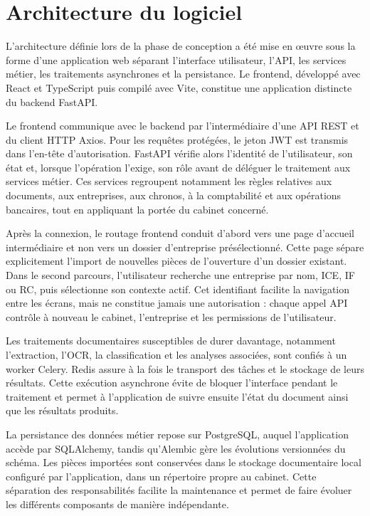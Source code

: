 \documentclass[12pt,a4paper,oneside]{report}
\begin{document}
\section{Architecture du logiciel}

L'architecture définie lors de la phase de conception a été mise en œuvre sous
la forme d'une application web séparant l'interface utilisateur, l'API, les
services métier, les traitements asynchrones et la persistance. Le frontend,
développé avec React et TypeScript puis compilé avec Vite, constitue une
application distincte du backend FastAPI.

Le frontend communique avec le backend par l'intermédiaire d'une API REST et
du client HTTP Axios. Pour les requêtes protégées, le jeton JWT est transmis
dans l'en-tête d'autorisation. FastAPI\cite{fastapi} vérifie alors l'identité de
l'utilisateur, son état et, lorsque l'opération l'exige, son rôle avant de
déléguer le traitement aux services métier. Ces services regroupent notamment
les règles relatives aux documents, aux entreprises, aux chronos, à la
comptabilité et aux opérations bancaires, tout en appliquant la portée du
cabinet concerné.

Après la connexion, le routage frontend conduit d'abord vers une page d'accueil
intermédiaire et non vers un dossier d'entreprise présélectionné. Cette page
sépare explicitement l'import de nouvelles pièces de l'ouverture d'un dossier
existant. Dans le second parcours, l'utilisateur recherche une entreprise par
nom, ICE, IF ou RC, puis sélectionne son contexte actif. Cet identifiant facilite
la navigation entre les écrans, mais ne constitue jamais une autorisation :
chaque appel API contrôle à nouveau le cabinet, l'entreprise et les permissions
de l'utilisateur.

Les traitements documentaires susceptibles de durer davantage, notamment
l'extraction, l'OCR, la classification et les analyses associées, sont confiés
à un worker Celery\cite{celery}. Redis\cite{redis} assure à la fois le transport des tâches et le
stockage de leurs résultats. Cette exécution asynchrone évite de bloquer
l'interface pendant le traitement et permet à l'application de suivre ensuite
l'état du document ainsi que les résultats produits.

La persistance des données métier repose sur PostgreSQL\cite{postgresql}, auquel l'application
accède par SQLAlchemy\cite{sqlalchemy}, tandis qu'Alembic gère les évolutions versionnées du
schéma. Les pièces importées sont conservées dans le stockage documentaire
local configuré par l'application, dans un répertoire propre au cabinet. Cette
séparation des responsabilités facilite la maintenance et permet de faire
évoluer les différents composants de manière indépendante.
\end{document}
